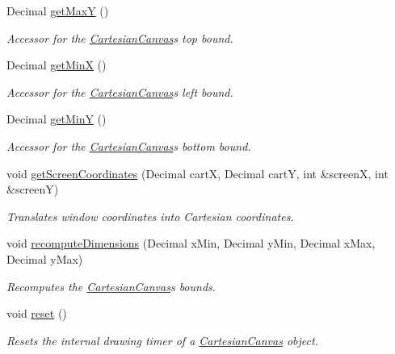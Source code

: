 \begin{DoxyCompactItemize}
Decimal \hyperlink{classtsgl_1_1_cartesian_canvas_a68c0616f8180690423d39e9e83045b8c}{get\+Max\+Y} ()
\begin{DoxyCompactList}\small\item\em Accessor for the \hyperlink{classtsgl_1_1_cartesian_canvas}{Cartesian\+Canvas}\textquotesingle{}s top bound. \end{DoxyCompactList}\item 
Decimal \hyperlink{classtsgl_1_1_cartesian_canvas_a4ab031c60f6fed675e8163c30c01e5d6}{get\+Min\+X} ()
\begin{DoxyCompactList}\small\item\em Accessor for the \hyperlink{classtsgl_1_1_cartesian_canvas}{Cartesian\+Canvas}\textquotesingle{}s left bound. \end{DoxyCompactList}\item 
Decimal \hyperlink{classtsgl_1_1_cartesian_canvas_a99c935c99c9a29f2cc918963d734d9a6}{get\+Min\+Y} ()
\begin{DoxyCompactList}\small\item\em Accessor for the \hyperlink{classtsgl_1_1_cartesian_canvas}{Cartesian\+Canvas}\textquotesingle{}s bottom bound. \end{DoxyCompactList}\item 
void \hyperlink{classtsgl_1_1_cartesian_canvas_a8fea34cfcee9bc577c1e1ab6d28a8185}{get\+Screen\+Coordinates} (Decimal cart\+X, Decimal cart\+Y, int \&screen\+X, int \&screen\+Y)
\begin{DoxyCompactList}\small\item\em Translates window coordinates into Cartesian coordinates. \end{DoxyCompactList}\item 
void \hyperlink{classtsgl_1_1_cartesian_canvas_ac833a44fe7367f6411292707de37beef}{recompute\+Dimensions} (Decimal x\+Min, Decimal y\+Min, Decimal x\+Max, Decimal y\+Max)
\begin{DoxyCompactList}\small\item\em Recomputes the \hyperlink{classtsgl_1_1_cartesian_canvas}{Cartesian\+Canvas}\textquotesingle{}s bounds. \end{DoxyCompactList}\item 
void \hyperlink{classtsgl_1_1_cartesian_canvas_a735ebb290eb1be110b3f7bb033018a21}{reset} ()
\begin{DoxyCompactList}\small\item\em Resets the internal drawing timer of a \hyperlink{classtsgl_1_1_cartesian_canvas}{Cartesian\+Canvas} object. \end{DoxyCompactList}\item 

\end{DoxyCompactItemize}
